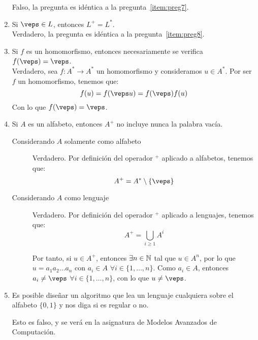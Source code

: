 \begin{enumerate}
        Falso, la pregunta es idéntica a la pregunta~\ref{item:preg7}.
    \item Si $\veps \in L$, entonces $L^+ = L^\ast$.\\

        Verdadero, la pregunta es idéntica a la pregunta~\ref{item:preg8}.
    \item Si $f$ es un homomorfismo, entonces necesariamente se verifica $f(\veps) = \veps$.\\
        
        Verdadero, sea $f:A^\ast\rightarrow A^\ast$ un homomorfismo y consideramos $u\in A^\ast$. Por ser $f$ un homomorfismo, tenemos que:
        \begin{equation*}
            f(u) = f(\veps u) = f(\veps)f(u)
        \end{equation*}
        Con lo que $f(\veps) = \veps$.
    \item Si $A$ es un alfabeto, entonces $A^+$ no incluye nunca la palabra vacía.\\
        \begin{description}
            \item[Considerando $A$ solamente como alfabeto] Verdadero. Por definición del operador $^+$ aplicado a alfabetos, tenemos que:
            \begin{equation*}
                A^+ = A^*\setminus \{\veps\}
            \end{equation*}

            \item[Considerando $A$ como lenguaje] Verdadero. Por definición del operador $^+$ aplicado a lenguajes, tenemos que:
            \begin{equation*}
                A^+ = \bigcup_{i\geq 1} A^i
            \end{equation*}

            Por tanto, si $u\in A^+$, entonces $\exists n\in \mathbb{N}$ tal que $u\in A^n$, por lo que $u=a_1a_2\ldots a_n$ con $a_i\in A$ $\forall i\in \{1,\ldots,n\}$. Como $a_i\in A$, entonces $a_i\neq \veps$ $\forall i\in \{1,\ldots,n\}$, con lo que $u\neq \veps$.
        \end{description}
    \item Es posible diseñar un algoritmo que lea un lenguaje cualquiera sobre el alfabeto $\{0,1\}$ y nos diga si es regular o no.
    
    Esto es falso, y se verá en la asignatura de Modelos Avanzados de Computación.
\end{enumerate}
